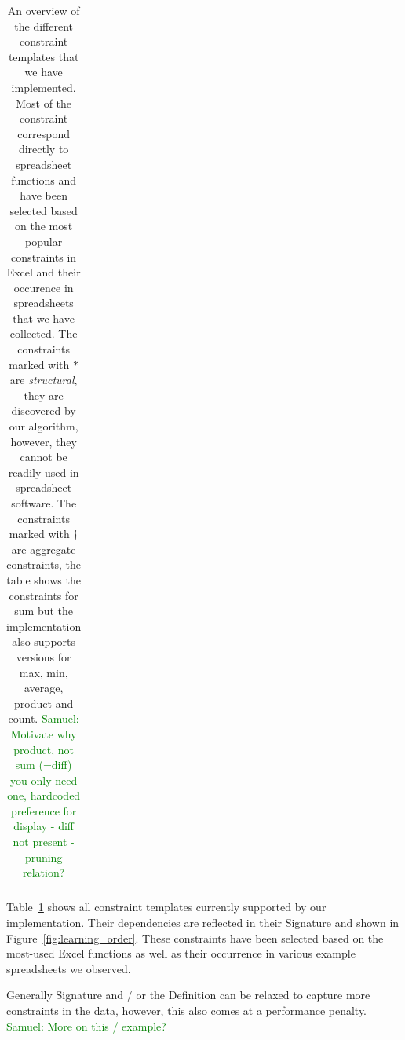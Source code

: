 \documentclass{ecai}
\newcommand{\sergey}[1]{\textcolor{magenta}{{\sc Sergey:} #1}\xspace}
\newcommand{\samuel}[1]{\textcolor{green}{{\sc Samuel:} #1}\xspace}
\newcommand{\constraints}{\ensuremath{\mathcal{T}}\xspace}
\newcommand{\format}[1]{\textit{#1}\xspace}
\newcommand{\extractgroups}{\format{extractGroups}}
\newcommand{\extracttables}{\format{extractTables}}
\newcommand{\learnconstraints}{\format{learnConstraints}}
\newcommand{\CSignature}{Signature\xspace}
\newcommand{\CFunction}{Definition\xspace}
\newcommand{\dependencies}{\ensuremath{\mathcal{D}}\xspace}
\begin{document}
\begin{table}
\begin{tabularx}{\textwidth}{l X X}
  \end{tabularx}
  \caption{
An overview of the different constraint templates that we have implemented.
Most of the constraint correspond directly to spreadsheet functions and have been selected based on the most popular constraints in Excel and their occurence in spreadsheets that we have collected.
The constraints marked with $*$ are \textit{structural}, they are discovered by our algorithm, however, they cannot be readily used in spreadsheet software.
The constraints marked with $\dagger$ are aggregate constraints, the table shows the constraints for sum but the implementation also supports versions for max, min, average, product and count.
  \samuel{Motivate why product, not sum (=diff) you only need one, hardcoded preference for display - diff not present - pruning relation?} 
  }


  \label{table:constraints}
\end{table}

Table~\ref{table:constraints} shows all constraint templates currently supported by our implementation.
Their dependencies are reflected in their \CSignature and shown in Figure~\ref{fig:learning_order}.
These constraints have been selected based on the most-used Excel functions as well as their occurrence in various example spreadsheets we observed.

Generally \CSignature and / or the \CFunction can be relaxed to capture more constraints in the data, however, this also comes at a performance penalty. \samuel{More on this / example?}


\end{document}
